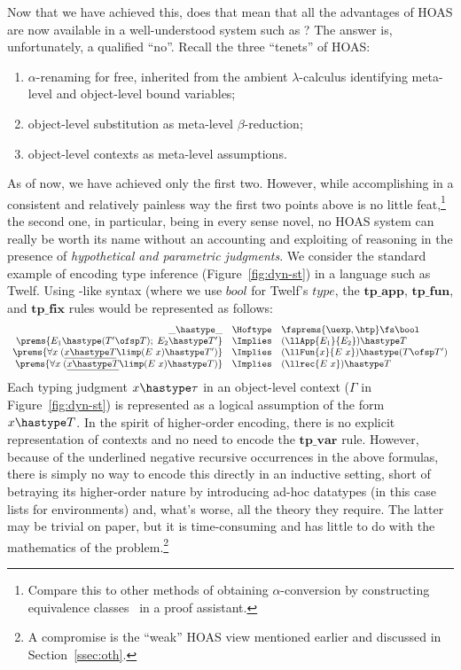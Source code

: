 \documentclass[final]{svjour3}
\begin{document}
Now that we have achieved this, does that mean that all the advantages
of HOAS are now available in a well-understood system such as \HOL\@?
The answer is, unfortunately, a qualified ``no''. Recall the three
``tenets'' of HOAS:
\begin{enumerate}
\item $\alpha$-renaming for free,  inherited from the ambient
  $\lambda$-calculus identifying meta-level and object-level bound variables;
\item object-level substitution as meta-level $\beta$-reduction;
\item object-level contexts as meta-level assumptions.
\end{enumerate}
As of now, we have achieved only the first two.  However,
while accomplishing in a consistent and relatively painless way the first
two points above is no little feat,\footnote{Compare this to other
  methods of obtaining $\alpha$-conversion by constructing equivalence
  classes~\cite{Vestergaard01rta,FordM03} in a proof assistant.} the
second one, in particular, being in every sense novel, no HOAS system
can really be worth its name without an accounting and exploiting
of reasoning in the presence of \emph{hypothetical and parametric
  judgments}.  
We consider the standard example of encoding type inference
(Figure~\ref{fig:dyn-st}) in a language such as Twelf.
Using
\HOL-like syntax (where we use $bool$ for Twelf's $type$, the
$\mathbf{tp\_app}$, $\mathbf{tp\_fun}$, and $\mathbf{tp\_fix}$ rules
would be represented as follows:
$$\begin{array}{rcl}
\_\hastype\_ & \Hoftype & \fsprems{\uexp, \htp} \fs \bool  \\
 \prems{E_1\hastype (T'\ofsp T);\; E_2\hastype T'}
  & \Implies & (\llApp {E_1} {E_2}) \hastype T \\
\prems {\forall x\;(\underline{x\hastype T}\limp (E\ x)\hastype T')}
  & \Implies & (\llFun{x} {E\ x})\hastype (T \ofsp T') \\
\prems {\forall x\;(\underline{x\hastype T}\limp (E\ x)\hastype T)}
  & \Implies & (\llrec{E\ x})\hastype T
\end{array}$$
Each typing judgment $x\hastype\tau$ in an object-level context
($\Gamma$ in Figure~\ref{fig:dyn-st}) is represented as a logical
assumption of the
form $x\hastype T$.  In the spirit of higher-order encoding, there is
no explicit representation of contexts and no need to encode the
$\mathbf{tp\_var}$ rule.  However, because of the underlined negative
recursive 
occurrences in the above formulas, there is simply no way to encode this directly 
in an inductive 
setting, short of betraying its higher-order nature by introducing
ad-hoc datatypes (in this case lists for environments) and, what's
worse, all the theory they require. The latter may be trivial on
paper, but it is time-consuming and has little to do with the
mathematics of the problem.\footnote{A compromise is the
  ``weak'' HOAS view mentioned earlier and discussed in
  Section~\ref{ssec:oth}.}
\end{document}
